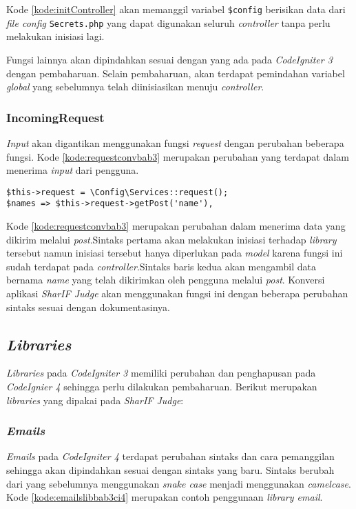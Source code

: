 Kode \ref{kode:initController} akan memanggil variabel \verb|$config| berisikan data dari \textit{file config} \texttt{Secrets.php} yang dapat digunakan seluruh \textit{controller} tanpa perlu melakukan inisiasi lagi.

Fungsi lainnya akan dipindahkan sesuai dengan yang ada pada \textit{CodeIgniter 3} dengan pembaharuan. Selain pembaharuan, akan terdapat pemindahan variabel \textit{global} yang sebelumnya telah diinisiasikan menuju \textit{controller}.

\subsubsection{IncomingRequest}
\textit{Input} akan digantikan menggunakan fungsi \textit{request} dengan perubahan beberapa fungsi. Kode \ref{kode:requestconvbab3} merupakan perubahan yang terdapat dalam menerima \textit{input} dari pengguna.

\begin{lstlisting}[caption=Contoh perubahan \textit{library request}, label=kode:requestconvbab3]
$this->request = \Config\Services::request(); 
$names => $this->request->getPost('name'),
\end{lstlisting}

Kode \ref{kode:requestconvbab3} merupakan perubahan dalam menerima data yang dikirim melalui \textit{post}.Sintaks pertama akan melakukan inisiasi terhadap \textit{library} tersebut namun inisiasi tersebut hanya diperlukan pada \textit{model} karena fungsi ini sudah terdapat pada \textit{controller}.Sintaks baris kedua akan mengambil data bernama \textit{name} yang telah dikirimkan oleh pengguna melalui \textit{post}. Konversi aplikasi \textit{SharIF Judge} akan menggunakan fungsi ini dengan beberapa perubahan sintaks sesuai dengan dokumentasinya.

\subsection{\textit{Libraries}}
\textit{Libraries} pada \textit{CodeIgniter 3} memiliki perubahan dan penghapusan pada \textit{CodeIgnier 4} sehingga perlu dilakukan pembaharuan. Berikut merupakan \textit{libraries} yang dipakai pada \textit{SharIF Judge}:

\subsubsection{\textit{Emails}}
\textit{Emails} pada \textit{CodeIgniter 4} terdapat perubahan sintaks dan cara pemanggilan sehingga akan dipindahkan sesuai dengan sintaks yang baru. Sintaks berubah dari yang sebelumnya menggunakan \textit{snake case} menjadi menggunakan \textit{camelcase}. Kode \ref{kode:emailslibbab3ci4} merupakan contoh penggunaan \textit{library email}.


